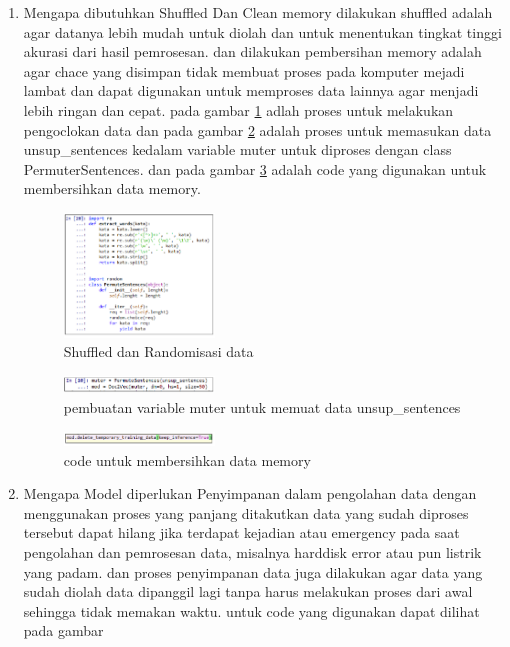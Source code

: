 \begin{enumerate}
        \item Mengapa dibutuhkan Shuffled Dan Clean memory
        \subitem dilakukan shuffled adalah agar datanya lebih mudah untuk diolah dan untuk menentukan tingkat tinggi akurasi dari hasil pemrosesan. dan dilakukan pembersihan memory adalah agar chace yang disimpan tidak membuat proses pada komputer mejadi lambat dan dapat digunakan untuk memproses data lainnya agar menjadi lebih ringan dan cepat.
        pada gambar \ref{l7} adlah proses untuk melakukan pengoclokan data dan pada gambar \ref{l8} adalah proses untuk memasukan data unsup\_sentences kedalam variable muter untuk diproses dengan class PermuterSentences. dan pada gambar \ref{l9} adalah code yang digunakan untuk membersihkan data memory.
        \begin{figure}[H]
            \includegraphics[width=4cm]{figures/1174026/5/23.png}
            \centering
            \caption{Shuffled dan Randomisasi data }
            \label{l7}
        \end{figure}
        \begin{figure}[H]
            \includegraphics[width=4cm]{figures/1174026/5/24.png}
            \centering
            \caption{pembuatan variable muter untuk memuat data unsup\_sentences}
            \label{l8}
        \end{figure}
        \begin{figure}[H]
            \includegraphics[width=4cm]{figures/1174026/5/25.png}
            \centering
            \caption{code untuk membersihkan data memory}
            \label{l9}
        \end{figure}
        
        
        \item Mengapa Model diperlukan Penyimpanan
        \subitem dalam pengolahan data dengan menggunakan proses yang panjang ditakutkan data yang sudah diproses tersebut dapat hilang jika terdapat kejadian atau emergency pada saat pengolahan dan pemrosesan data, misalnya harddisk error atau pun listrik yang padam. dan proses penyimpanan data juga dilakukan agar data yang sudah diolah data dipanggil lagi tanpa harus melakukan proses dari awal sehingga tidak memakan waktu. untuk code yang digunakan dapat dilihat pada gambar
        

\end{enumerate}
